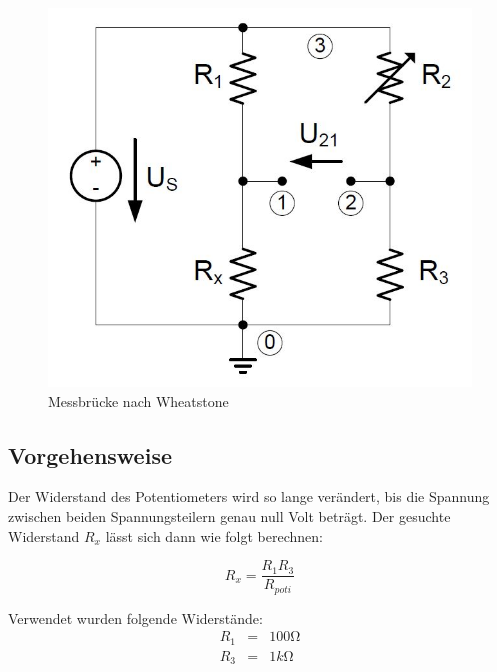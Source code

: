 \documentclass[10pt]{report}
\begin{document}
        \begin{center}
            \begin{figure}[H]
                \includegraphics[width=\textwidth]{Wheatstone.JPG}
              \caption{Messbrücke nach Wheatstone}
            \end{figure}
        \end{center}


        \subsection{Vorgehensweise}
        Der Widerstand des Potentiometers wird so lange verändert, bis die Spannung
        zwischen beiden Spannungsteilern genau null Volt beträgt. Der gesuchte
        Widerstand $R_x$ lässt sich dann wie folgt berechnen:

        \begin{equation*}
            R_x = \frac{R_1 R_3}{R_{poti}}
        \end{equation*}

        \vspace{0.5cm}

        Verwendet wurden folgende Widerstände:
        \begin{eqnarray*}
            R_1 &=& 100\si{\ohm}\\
            R_3 &=& 1\si{k\ohm}
        \end{eqnarray*}
\end{document}
